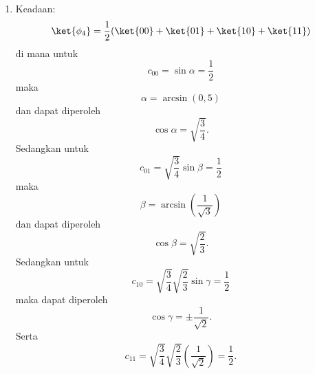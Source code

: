 \begin{enumerate}
	\item Keadaan:
	\begin{equation}
		\ket{\phi_4}=\frac{1}{2}(\ket{00}+\ket{01}+\ket{10}+\ket{11}) \label{keadaan4,2qubit}
	\end{equation}
	di mana untuk
	\begin{equation*}
		c_{00}=\sin\alpha=\frac{1}{2}
	\end{equation*}
	maka
	\begin{equation*}
		\alpha=\arcsin(0,5)
	\end{equation*}
	dan dapat diperoleh
	\begin{equation*}
		\cos\alpha=\sqrt{\frac{3}{4}}.
	\end{equation*}
	Sedangkan untuk
	\begin{equation*}
		c_{01}=\sqrt{\frac{3}{4}}\sin\beta=\frac{1}{2}
	\end{equation*}
	maka
	\begin{equation*}
		\beta=\arcsin(\frac{1}{\sqrt{3}})
	\end{equation*}
	dan dapat diperoleh
	\begin{equation*}
		\cos\beta=\sqrt{\frac{2}{3}}.
	\end{equation*}
	Sedangkan untuk
	\begin{equation*}
		c_{10}=\sqrt{\frac{3}{4}}\sqrt{\frac{2}{3}}\sin\gamma=\frac{1}{2}
	\end{equation*}
	maka dapat diperoleh
	\begin{equation*}
		\cos\gamma=\pm\frac{1}{\sqrt{2}}.
	\end{equation*}
	Serta
	\begin{equation*}
		c_{11}=\sqrt{\frac{3}{4}}\sqrt{\frac{2}{3}}(\frac{1}{\sqrt{2}})=\frac{1}{2}.
	\end{equation*}
	

\end{enumerate}
